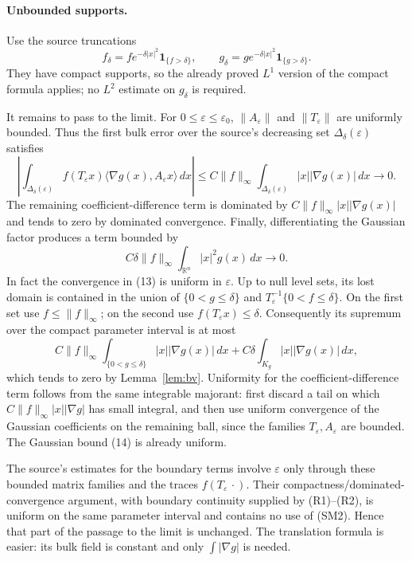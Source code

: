 \documentclass[11pt]{article}
\newcommand{\R}{\mathbb R}
\begin{document}
\paragraph{Unbounded supports.}
Use the source truncations
\[
 f_\delta=f e^{-\delta|x|^2}\mathbf1_{\{f>\delta\}},\qquad
 g_\delta=g e^{-\delta|x|^2}\mathbf1_{\{g>\delta\}}.
\]
They have compact supports, so the already proved $L^1$ version of the compact
formula applies; no $L^2$ estimate on $g_\delta$ is required.

It remains to pass to the limit.  For $0\le\varepsilon\le\varepsilon_0$,
$\|A_\varepsilon\|$ and $\|T_\varepsilon\|$ are uniformly bounded.  Thus the
first bulk error over the source's decreasing set
$\Delta_\delta(\varepsilon)$ satisfies
\[
 \left|\int_{\Delta_\delta(\varepsilon)}
 f(T_\varepsilon x)\langle\nabla g(x),A_\varepsilon x\rangle\,dx\right|
 \le C\|f\|_\infty
 \int_{\Delta_\delta(\varepsilon)}|x||\nabla g(x)|\,dx\longrightarrow0.
 \tag{13}
\]
The remaining coefficient-difference term is dominated by
$C\|f\|_\infty|x||\nabla g(x)|$ and tends to zero by dominated convergence.
Finally, differentiating the Gaussian factor produces a term bounded by
\[
 C\delta\|f\|_\infty\int_{\R^n}|x|^2g(x)\,dx\longrightarrow0.
 \tag{14}
\]
In fact the convergence in (13) is uniform in $\varepsilon$.  Up to null
level sets, its lost domain is contained in the union of
\(
 \{0<g\le\delta\}
\)
and
\(
 T_\varepsilon^{-1}\{0<f\le\delta\}.
\)
On the first set use $f\le\|f\|_\infty$; on the second use
$f(T_\varepsilon x)\le\delta$.  Consequently its supremum over the compact
parameter interval is at most
\[
 C\|f\|_\infty\int_{\{0<g\le\delta\}}|x||\nabla g(x)|\,dx
 +C\delta\int_{K_g}|x||\nabla g(x)|\,dx,
 \tag{15}
\]
which tends to zero by Lemma~\ref{lem:bv}.  Uniformity for the
coefficient-difference term follows from the same integrable majorant: first
discard a tail on which
$C\|f\|_\infty|x||\nabla g|$ has small integral, and then use uniform
convergence of the Gaussian coefficients on the remaining ball, since the
families $T_\varepsilon,A_\varepsilon$ are bounded.  The Gaussian bound (14)
is already uniform.

The source's estimates for the boundary terms involve $\varepsilon$ only
through these bounded matrix families and the traces
$f(T_\varepsilon\,\cdot)$.  Their compactness/dominated-convergence argument,
with boundary continuity supplied by \textup{(R1)}--\textup{(R2)}, is uniform
on the same parameter interval and contains no use of \textup{(SM2)}.  Hence
that part of the passage to the limit is unchanged.
The translation formula is easier: its bulk field is constant and only
$\int|\nabla g|$ is needed.
\end{document}
